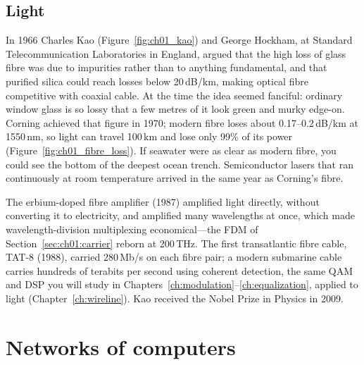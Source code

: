 \subsection{Light}


In 1966 Charles Kao (Figure~\ref{fig:ch01_kao}) and George Hockham, at Standard Telecommunication
Laboratories in England, argued that the high loss of glass fibre was due to impurities rather than to
anything fundamental, and that purified silica could reach losses below 20\,dB/km, making optical
fibre competitive with coaxial cable. At the time the idea seemed fanciful: ordinary window glass is so
lossy that a few metres of it look green and murky edge-on. Corning achieved that figure in 1970;
modern fibre loses about 0.17--0.2\,dB/km at 1550\,nm, so light can travel 100\,km and lose only 99\%
of its power (Figure~\ref{fig:ch01_fibre_loss}). If seawater were as clear as modern fibre, you could
see the bottom of the deepest ocean trench. Semiconductor lasers that ran continuously at room
temperature arrived in the same year as Corning's fibre.



The erbium-doped fibre amplifier (1987) amplified light directly, without converting it to
electricity, and amplified many wavelengths at once, which made wavelength-division multiplexing
economical---the FDM of Section~\ref{sec:ch01:carrier} reborn at 200\,THz. The first transatlantic fibre
cable, TAT-8 (1988), carried 280\,Mb/s on each fibre pair; a modern submarine cable carries hundreds of
terabits per second using coherent detection, the same QAM and DSP you will study in
Chapters~\ref{ch:modulation}--\ref{ch:equalization}, applied to light (Chapter~\ref{ch:wireline}).
Kao received the Nobel Prize in Physics in 2009.

\chOneNeed
\section{Networks of computers}
\label{sec:ch01:internet}

